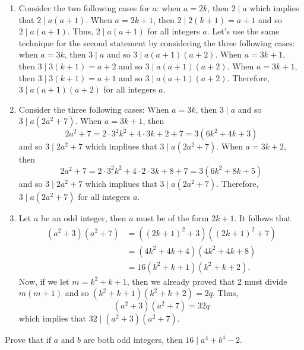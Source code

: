 \begin{solution}
    \begin{enumerate}
        \item Consider the two following cases for $a$: when $a = 2k$, then $2 \mid a$ which implies that $2 \mid a(a+1)$. When $a = 2k+1$, then $2 \mid 2(k+1) = a+1$ and so $2 \mid a(a+1)$. Thus, $2 \mid a(a+1)$ for all integers $a$. Let's use the same technique for the second statement by considering the three following cases: when $a = 3k$, then $3 \mid a$ and so $3 \mid a(a+1)(a+2)$. When $a = 3k+1$, then $3 \mid 3(k+1) = a+2$ and so $3 \mid a(a+1)(a+2)$. When $a = 3k+1$, then $3 \mid 3(k+1) = a+1$ and so $3 \mid a(a+1)(a+2)$. Therefore, $3 \mid a(a+1)(a+2)$ for all integers $a$.
        \item Consider the three following cases: When $a = 3k$, then $3 \mid a$ and so $3 \mid a(2a^2 + 7)$. When $a = 3k+1$, then
        $$2a^2 + 7 = 2 \cdot 3^2k^2 + 4\cdot 3k + 2 + 7 = 3(6k^2 + 4k + 3)$$
        and so $3 \mid 2a^2 + 7$ which impliues that $3\mid a(2a^2 + 7)$. When $a = 3k+2$, then
        $$2a^2 + 7 = 2 \cdot 3^2k^2 + 4 \cdot 2\cdot 3k + 8 + 7 = 3(6k^2 + 8k + 5)$$
        and so $3 \mid 2a^2 + 7$ which impliues that $3\mid a(2a^2 + 7)$. Therefore, $3 \mid a(2a^2 + 7)$ for all integers $a$.
        \item Let $a$ be an odd integer, then $a$ must be of the form $2k+1$. It follows that
        \begin{align*}
            (a^2 + 3)(a^2 + 7) &= ((2k+1)^2 + 3)((2k+1)^2 + 7) \\
            &= (4k^2 + 4k + 4)(4k^2 + 4k + 8) \\
            &= 16(k^2 + k + 1)(k^2 + k + 2).
        \end{align*}
        Now, if we let $m = k^2 + k + 1$, then we already proved that 2 must divide $m(m+1)$ and so $(k^2 + k + 1)(k^2 + k + 2) = 2q$. Thus, 
        $$(a^2 + 3)(a^2 + 7) = 32q$$
        which implies that $32 \mid (a^2 + 3)(a^2 + 7)$.
    \end{enumerate}
\end{solution}

\begin{exercise}
    Prove that if $a$ and $b$ are both odd integers, then $16 \mid a^4 + b^4 - 2$. \\
\end{exercise}

